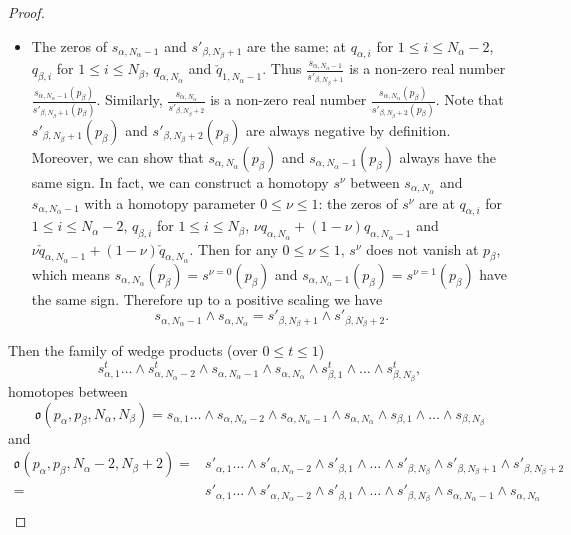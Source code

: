 \documentclass[10pt,a4paper]{amsart}
\begin{document}
\begin{proof}
\begin{itemize}
        \item The zeros of $s_{\alpha,N_\alpha-1}$ and $s'_{\beta,N_\beta+1}$ are the same: at $q_{\alpha,i}$ for $1\le i \le N_\alpha-2$, $q_{\beta,i}$ for $1\le i \le N_\beta$, $q_{\alpha,N_\alpha}$ and $\check{q}_{1,N_\alpha-1}$. Thus $\frac{s_{\alpha,N_\alpha-1}}{s'_{\beta,N_\beta+1}}$ is a non-zero real number  $\frac{s_{\alpha,N_\alpha-1}(p_\beta)}{s'_{\beta,N_\beta+1}(p_\beta)}$. Similarly, $\frac{s_{\alpha,N_\alpha}}{s'_{\beta,N_\beta+2}}$ is a non-zero real number  $\frac{s_{\alpha,N_\alpha}(p_\beta)}{s'_{\beta,N_\beta+2}(p_\beta)}$. Note that $s'_{\beta,N_\beta+1}(p_\beta)$ and $s'_{\beta,N_\beta+2}(p_\beta)$ are always negative by definition. 
        Moreover, we can show that $s_{\alpha,N_\alpha}(p_\beta)$ and $s_{\alpha,N_\alpha-1}(p_\beta)$ always have the same sign. In fact, we can construct a homotopy $s^\nu$ between $s_{\alpha,N_\alpha}$ and $s_{\alpha,N_\alpha-1}$ with a homotopy parameter $0\le \nu \le 1$: the zeros of $s^\nu$ are at $q_{\alpha,i}$ for $1\le i \le N_\alpha-2$, $q_{\beta,i}$ for $1\le i \le N_\beta$, $\nu q_{\alpha,N_\alpha}+(1-\nu)q_{\alpha,N_\alpha-1}$ and $\nu\check{q}_{\alpha,N_\alpha-1}+(1-\nu)\check{q}_{\alpha,N_\alpha}$. 
        Then for any $0\le \nu \le 1$, $s^\nu$ does not vanish at $p_\beta$, which means $s_{\alpha,N_\alpha}(p_\beta)=s^{\nu=0}(p_\beta)$ and $s_{\alpha,N_\alpha-1}(p_\beta)=s^{\nu=1}(p_\beta)$ have the same sign. Therefore up to a positive scaling we have
        $$
        s_{\alpha,N_\alpha-1}\wedge s_{\alpha,N_\alpha}=s'_{\beta,N_\beta+1} \wedge s'_{\beta,N_\beta+2}.
        $$
    \end{itemize}
    Then the family of wedge products (over $0\le t \le 1$)
    $$
    s^t_{\alpha,1}\dots \wedge s^t_{\alpha,N_\alpha-2}\wedge s_{\alpha,N_\alpha-1}\wedge s_{\alpha,N_\alpha}\wedge s^t_{\beta,1}\wedge \dots \wedge s^t_{\beta,N_\beta},
    $$
    homotopes between 
    $$\mathfrak o(p_\alpha,p_\beta,N_\alpha,N_\beta)= s_{\alpha,1}\dots \wedge s_{\alpha,N_\alpha-2}\wedge s_{\alpha,N_\alpha-1}\wedge s_{\alpha,N_\alpha}\wedge s_{\beta,1}\wedge \dots \wedge s_{\beta,N_\beta}$$
    and 
    \begin{equation*}
    \begin{split}
        \mathfrak o(p_\alpha,p_\beta,N_\alpha-2,N_\beta+2)=& s'_{\alpha,1}\dots \wedge s'_{\alpha,N_\alpha-2}\wedge s'_{\beta,1}\wedge \dots \wedge s'_{\beta,N_\beta} \wedge s'_{\beta,N_\beta+1}\wedge s'_{\beta,N_\beta+2}\\
        =&s'_{\alpha,1}\dots \wedge s'_{\alpha,N_\alpha-2}\wedge s'_{\beta,1}\wedge \dots \wedge s'_{\beta,N_\beta} \wedge s_{\alpha,N_\alpha-1}\wedge s_{\alpha,N_\alpha}\\

\end{split}
\end{equation*}
\end{proof}
\end{document}
